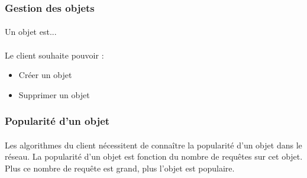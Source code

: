 \documentclass[12pt]{article}
\begin{document}
\subsubsection{Gestion des objets}

\paragraph{} Un objet est...

\paragraph{} Le client souhaite pouvoir :
\begin{itemize}
 \item Créer un objet
 \item Supprimer un objet
\end{itemize}

\subsubsection{Popularité d'un objet}

\paragraph{} Les algorithmes du client nécessitent de connaître la popularité d'un objet dans le réseau.
La popularité d'un objet est fonction du nombre de requêtes sur cet objet. Plus ce nombre de requête est grand, plus l'objet est populaire.




\end{document}
